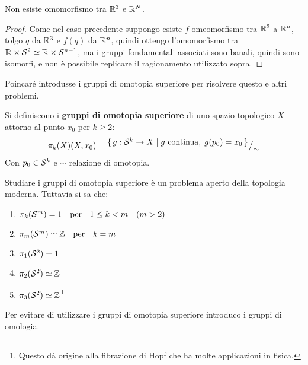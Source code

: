\begin{proposition}
  Non esiste omomorfismo tra $ \mathbb{R}^{3} $ e $ \mathbb{R}^{N} $.
\end{proposition}

\begin{proof}
  Come nel caso precedente suppongo esiste $ f $ omeomorfismo tra $ \mathbb{R}^{3} $ a
  $ \mathbb{R}^{n} $, tolgo $ q $ da $ \mathbb{R}^{3} $ e $ f(q) $ da $ \mathbb{R}^{n} $, quindi ottengo
  l'omomorfismo tra $ \mathbb{R}^{} \times \mathcal{S}^{2} \simeq \mathbb{R}^{} \times \mathcal{S}^{n-1} $, ma i gruppi
  fondamentali associati sono banali, quindi sono isomorfi, e non è possibile
  replicare il ragionamento utilizzato sopra.
\end{proof}
\hfill \newline \newline \noindent
Poincaré introdusse i gruppi di  omotopia superiore per risolvere questo e altri problemi.
\begin{definition}
  Si definiscono i \textbf{gruppi di omotopia superiore} di uno spazio topologico $ X $
  attorno al punto $ x_0 $ per $ k \geq 2 $:
  \[
    \pi_k(X) (X, x_0) = {^{\textstyle \set{ g: \mathcal{S}^{k} \to X | g \text{ continua}, \; g(p_0) = x_0}}\big/_{\textstyle \sim}}
  \]
  Con $ p_0 \in \mathcal{S}^{k} $ e $ \sim $ relazione di omotopia.
\end{definition}
Studiare i gruppi di omotopia superiore è un problema aperto della topologia moderna.
Tuttavia si sa che:
\begin{enumerate}
\item $ \pi_k(\mathcal{S}^{m}) = 1 \quad \text{per} \quad 1 \leq k < m \quad (m > 2)$
\item $ \pi_m(\mathcal{S}^{m}) \simeq \mathbb{Z} \quad \text{per} \quad k = m $
\item $ \pi_1(\mathcal{S}^{2}) = 1 $
\item $ \pi_2(\mathcal{S}^{2}) \simeq \mathbb{Z} $
\item $ \pi_3(\mathcal{S}^{2}) \simeq \mathbb{Z} $\footnote[$\dagger$]{Questo dà origine alla fibrazione di Hopf che ha molte applicazioni in fisica.}
\end{enumerate}

Per evitare di utilizzare i gruppi di omotopia superiore introduco i gruppi di omologia.


